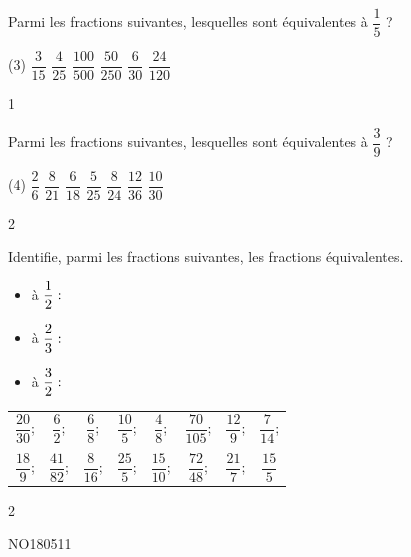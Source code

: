 \documentclass[a4paper,12pt]{report}
\begin{document}
\begin{exo}{
Parmi les fractions suivantes, lesquelles sont équivalentes à $\dfrac{1}{5}$ ?
\begin{tasks}(3)
\task $\dfrac{3}{15}$
\task $\dfrac{4}{25}$
\task $\dfrac{100}{500}$
\task $\dfrac{50}{250}$
\task $\dfrac{6}{30}$
\task $\dfrac{24}{120}$
\end{tasks}
 \vspace{1pt}
}{1}\end{exo}

\begin{exo}{
Parmi les fractions suivantes, lesquelles sont équivalentes à $\dfrac{3}{9}$ ?
\begin{tasks}(4)
\task $\dfrac{2}{6}$
\task $\dfrac{8}{21}$
\task $\dfrac{6}{18}$
\task $\dfrac{5}{25}$
\task $\dfrac{8}{24}$
\task $\dfrac{12}{36}$
\task $\dfrac{10}{30}$
\end{tasks}
 \vspace{1pt}
}{2}\end{exo}

\begin{exop}{
Identifie, parmi les fractions suivantes, les fractions équivalentes.
\vspace{10pt}
\begin{itemize}
    \item[] à $\dfrac{1}{2}:\hrulefill$\\
    \item[] à $\dfrac{2}{3}:\hrulefill$\\
    \item[] à $\dfrac{3}{2}:\hrulefill$\\
\end{itemize}
\vspace{0.5cm}

 \begin{center}
\begin{tabular}{cccccccc}
     $\dfrac{20}{30}$;&$\dfrac{6}{2}$;&$\dfrac{6}{8}$;&$\dfrac{10}{5}$;&$\dfrac{4}{8}$;&$\dfrac{70}{105}$;&$\dfrac{12}{9}$;&$\dfrac{7}{14}$;\\
		      &&&&&&&\\
     $\dfrac{18}{9}$;&$\dfrac{41}{82}$;&$\dfrac{8}{16}$;&$\dfrac{25}{5}$;&$\dfrac{15}{10}$;&$\dfrac{72}{48}$;&$\dfrac{21}{7}$;& $\dfrac{15}{5}$\\
\end{tabular}
\end{center}
}{2}\end{exop}


\begin{exol}{NO180}{51}{1}
\end{exol}
\end{document}
